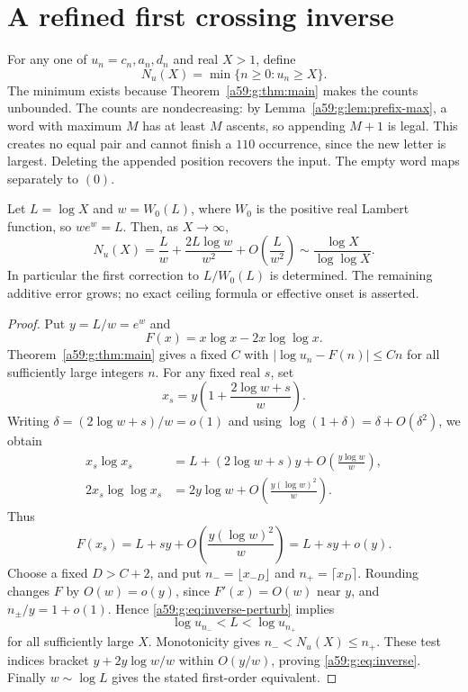 \documentclass[11pt,letterpaper]{article}
\theoremstyle{remark}\newtheorem{remark}[theorem]{Remark}
\theoremstyle{remark}\newtheorem{wremark}{Remark}\renewcommand{\thewremark}{W\arabic{wremark}}
\theoremstyle{plain}\newtheorem{wcorollary}[wremark]{Corollary}
\begin{document}
\section{A refined first crossing inverse}\label{a59:g:sec:inverse}
For any one of $u_n=c_n,a_n,d_n$ and real $X>1$, define
\[
 N_u(X)=\min\{n\geq0:u_n\geq X\}.
\]
The minimum exists because Theorem~\ref{a59:g:thm:main} makes the counts unbounded. The counts are nondecreasing: by Lemma~\ref{a59:g:lem:prefix-max}, a word with maximum $M$ has at least $M$ ascents, so appending $M+1$ is legal. This creates no equal pair and cannot finish a $110$ occurrence, since the new letter is largest. Deleting the appended position recovers the input. The empty word maps separately to $(0)$.

\begin{proposition}\label{a59:g:prop:inverse}
Let $L=\log X$ and $w=W_0(L)$, where $W_0$ is the positive real Lambert function, so $we^w=L$. Then, as $X\to\infty$,
\begin{equation}\label{a59:g:eq:inverse}
 N_u(X)=\frac Lw+\frac{2L\log w}{w^2}
                    +O\!\left(\frac L{w^2}\right)
       \sim\frac{\log X}{\log\log X}.
\end{equation}
In particular the first correction to $L/W_0(L)$ is determined. The remaining additive error grows; no exact ceiling formula or effective onset is asserted.
\end{proposition}
\begin{proof}
Put $y=L/w=e^w$ and
\[
 F(x)=x\log x-2x\log\log x.
\]
Theorem~\ref{a59:g:thm:main} gives a fixed $C$ with
$|\log u_n-F(n)|\leq Cn$ for all sufficiently large integers $n$.
For any fixed real $s$, set
\[
 x_s=y\left(1+\frac{2\log w+s}{w}\right).
\]
Writing $\delta=(2\log w+s)/w=o(1)$ and using
$\log(1+\delta)=\delta+O(\delta^2)$, we obtain
\begin{align*}
 x_s\log x_s
   &=L+(2\log w+s)y+O\!\left(\frac{y\log w}{w}\right),\\
 2x_s\log\log x_s
   &=2y\log w+O\!\left(\frac{y(\log w)^2}{w}\right).
\end{align*}
Thus
\begin{equation}\label{a59:g:eq:inverse-perturb}
 F(x_s)=L+sy+O\!\left(\frac{y(\log w)^2}{w}\right)=L+sy+o(y).
\end{equation}
Choose a fixed $D>C+2$, and put $n_- =\lfloor x_{-D}\rfloor$ and $n_+=\lceil x_D\rceil$. Rounding changes $F$ by $O(w)=o(y)$, since $F'(x)=O(w)$ near $y$, and $n_\pm/y=1+o(1)$. Hence \eqref{a59:g:eq:inverse-perturb} implies
\[
 \log u_{n_-}<L<\log u_{n_+}
\]
for all sufficiently large $X$. Monotonicity gives $n_-<N_u(X)\leq n_+$. These test indices bracket
$y+2y\log w/w$ within $O(y/w)$, proving \eqref{a59:g:eq:inverse}. Finally $w\sim\log L$ gives the stated first-order equivalent.
\end{proof}
\end{document}
